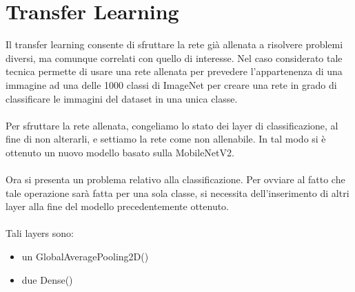 \section{Transfer Learning}

Il transfer learning consente di sfruttare la rete già allenata a risolvere problemi diversi, ma comunque correlati con quello di interesse.
Nel caso considerato tale tecnica permette di usare una rete allenata per prevedere l'appartenenza di una immagine ad una delle 1000 classi di ImageNet
per creare una rete in grado di classificare le immagini del dataset in una unica classe.
\\\\
Per sfruttare la rete allenata, congeliamo lo stato dei layer di classificazione, al fine di non alterarli, e settiamo la rete come non allenabile.
In tal modo si è ottenuto un nuovo modello basato sulla MobileNetV2.
\\\\
Ora si presenta un problema relativo alla classificazione. Per ovviare al fatto che tale operazione sarà fatta per una sola classe, si necessita dell'inserimento di altri layer alla fine del modello precedentemente ottenuto.
\\\\
Tali layers sono:
\begin{itemize}
    \item un GlobalAveragePooling2D()
    \item due Dense() 
\end{itemize}  

